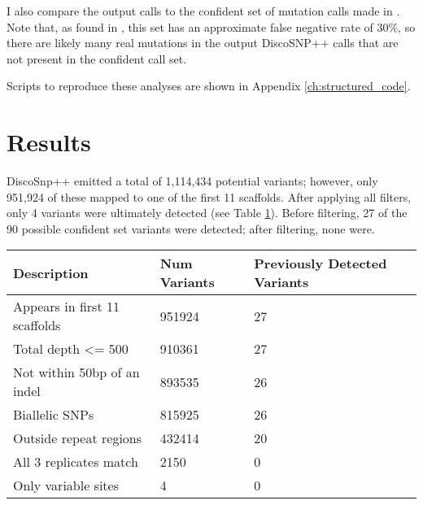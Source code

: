 I also compare the output calls to the confident set of mutation calls made in \textcite{orr_phylogenomic_2020}. Note that, as found in \textcite{orr_phylogenomic_2020}, this set has an approximate false negative rate of 30\%, so there are likely many real mutations in the output DiscoSNP++ calls that are not present in the confident call set.

Scripts to reproduce these analyses are shown in Appendix \ref{ch:structured_code}.

\section{Results}

DiscoSnp++ emitted a total of 1,114,434 potential variants; however, only 951,924 of these mapped to one of the first 11 scaffolds. After applying all filters, only 4 variants were ultimately detected (see Table \ref{tbl:ev_num_variants}). Before filtering, 27 of the 90 possible confident set variants were detected; after filtering, none were.

\begin{table}
\begin{tabularx}{\textwidth}{X X X}
\toprule
\textbf{Description} & \textbf{Num \newline Variants} & \textbf{Previously Detected Variants}\\
\midrule
Appears in first 11 scaffolds & 951924 & 27\\
Total depth <= 500 & 910361 & 27\\
Not within 50bp of an indel & 893535 & 26\\
Biallelic SNPs & 815925 & 26\\
Outside repeat regions & 432414 & 20\\
All 3 replicates match & 2150 & 0\\
Only variable sites & 4 & 0\\
\bottomrule
\end{tabularx}
\label{tbl:ev_num_variants}
\end{table}

